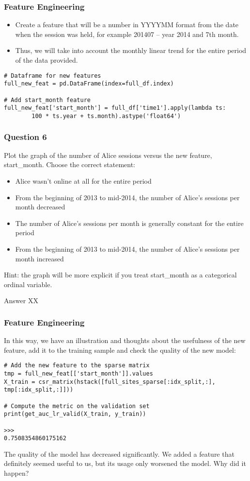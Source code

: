 \begin{frame}[fragile]\frametitle{Feature Engineering}	
\begin{itemize}
\item Create a feature that will be a number in YYYYMM format from the date when the session was held, for example 201407 -- year 2014 and 7th month. 
\item Thus, we will take into account the monthly linear trend for the entire period of the data provided.
\end{itemize}

\begin{lstlisting}
# Dataframe for new features
full_new_feat = pd.DataFrame(index=full_df.index)

# Add start_month feature
full_new_feat['start_month'] = full_df['time1'].apply(lambda ts: 
        100 * ts.year + ts.month).astype('float64')
\end{lstlisting}
\end{frame}

\begin{frame}[fragile]\frametitle{Question 6}
Plot the graph of the number of Alice sessions versus the new feature, start\_month. Choose the correct statement:
\begin{itemize}
\item Alice wasn't online at all for the entire period
\item From the beginning of 2013 to mid-2014, the number of Alice's sessions per month decreased
\item The number of Alice's sessions per month is generally constant for the entire period
\item From the beginning of 2013 to mid-2014, the number of Alice's sessions per month increased
\end{itemize}
Hint: the graph will be more explicit if you treat start\_month as a categorical ordinal variable.

Answer XX
\end{frame}

\begin{frame}[fragile]\frametitle{Feature Engineering}	
In this way, we have an illustration and thoughts about the usefulness of the new feature, add it to the training sample and check the quality of the new model:


\begin{lstlisting}
# Add the new feature to the sparse matrix
tmp = full_new_feat[['start_month']].values
X_train = csr_matrix(hstack([full_sites_sparse[:idx_split,:], tmp[:idx_split,:]]))

# Compute the metric on the validation set
print(get_auc_lr_valid(X_train, y_train))

>>>
0.7508354860175162
\end{lstlisting}

The quality of the model has decreased significantly. We added a feature that definitely seemed useful to us, but its usage only worsened the model. Why did it happen?
\end{frame}


